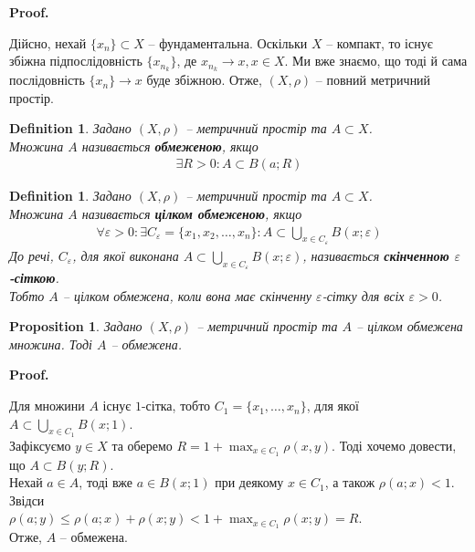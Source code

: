 \documentclass[a4paper, 10pt]{article}
\makeatletter
\theoremstyle{theoremdd}
\theoremstyle{theoremdd}
\newtheorem{definition}[theorem]{Definition}
\theoremstyle{theoremdd}
\theoremstyle{theoremdd}
\theoremstyle{theoremdd}
\newtheorem{proposition}[theorem]{Proposition}
\theoremstyle{theoremdd}
\theoremstyle{theoremdd}
\theoremstyle{theoremdd}
\renewenvironment{proof}[1][Proof.\\]{\par
\pushQED{\hfill \qed}%
\normalfont \topsep6\p@\@plus6\p@\relax
\trivlist
\item\relax
{\bfseries
#1\@addpunct{.}}\hspace\labelsep\ignorespaces
}{%
\popQED\endtrivlist\@endpefalse
}
\makeatother
\begin{document}
\begin{proof}
Дійсно, нехай $\{x_n\} \subset X$ -- фундаментальна. Оскільки $X$ -- компакт, то існує збіжна підпослідовність $\{x_{n_k}\}$, де $x_{n_k} \to x, x \in X$. Ми вже знаємо, що тоді й сама послідовність $\{x_n\} \to x$ буде збіжною. Отже, $(X,\rho)$ -- повний метричний простір.
\end{proof}

\begin{definition}
Задано $(X,\rho)$ -- метричний простір та $A \subset X$.\\
Множина $A$ називається \textbf{обмеженою}, якщо
\begin{align*}
\exists R > 0: A \subset B(a;R)
\end{align*}
\end{definition}

\begin{definition}
Задано $(X,\rho)$ -- метричний простір та $A \subset X$.\\
Множина $A$ називається \textbf{цілком обмеженою}, якщо
\begin{align*}
\forall \varepsilon > 0: \exists C_\varepsilon = \{x_1,x_2,\dots,x_n\}: A \subset \displaystyle\bigcup_{x \in C_\varepsilon} B(x;\varepsilon)
\end{align*}
До речі, $C_\varepsilon$, для якої виконана $A \subset \displaystyle\bigcup_{x \in C_\varepsilon} B(x;\varepsilon)$, називається \textbf{скінченною $\varepsilon$-сіткою}.\\
Тобто $A$ -- цілком обмежена, коли вона має скінченну $\varepsilon$-сітку для всіх $\varepsilon > 0$.
\end{definition}

\begin{proposition}
Задано $(X,\rho)$ -- метричний простір та $A$ -- цілком обмежена множина. Тоді $A$ -- обмежена.
\end{proposition}

\begin{proof}
Для множини $A$ існує $1$-сітка, тобто $C_1 = \{x_1,\dots,x_n\}$, для якої $A \subset \displaystyle\bigcup_{x \in C_1} B(x;1)$.\\
Зафіксуємо $y \in X$ та оберемо $R = 1 +\displaystyle\max_{x \in C_1} \rho(x,y)$. Тоді хочемо довести, що $A \subset B(y;R)$.\\
Нехай $a \in A$, тоді вже $a \in B(x;1)$ при деякому $x \in C_1$, а також $\rho(a;x) < 1$. Звідси\\
$\rho(a;y) \leq \rho(a;x) + \rho(x;y) < 1 + \displaystyle\max_{x \in C_1} \rho(x;y) = R$.\\
Отже, $A$ -- обмежена.
\end{proof}
\end{document}
